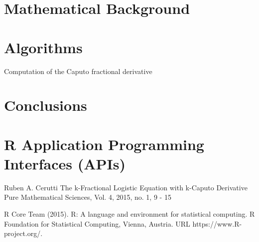 \section{Mathematical Background}


\section{Algorithms}

\begin{algorithm}[H]
\footnotesize
\begin{algorithmic}[1]

\end{algorithmic}
\caption{Computation of the Caputo fractional derivative}
	\label{Algorithm_1}
\end{algorithm}

\section{Conclusions}


\section{R Application Programming Interfaces (APIs)}





\begin{thebibliography}{00}


 Ruben A. Cerutti
\newblock The k-Fractional Logistic Equation with k-Caputo Derivative
\newblock Pure Mathematical Sciences, Vol.  4, 2015, no.  1, 9 - 15


R Core Team (2015). 
\newblock R: A language and environment for statistical computing. R Foundation for Statistical Computing, Vienna, Austria.
\newblock URL https://www.R-project.org/.

\end{thebibliography}

